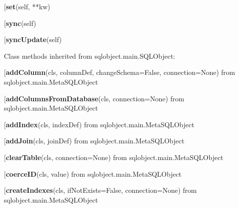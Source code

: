 \begin{description}\item[{\bf set}(self, **kw)\end{description}

\begin{description}\item[{\bf sync}(self)\end{description}

\begin{description}\item[{\bf syncUpdate}(self)\end{description}


Class methods inherited from sqlobject.main.SQLObject:\\
\begin{description}\item[{\bf addColumn}(cls, columnDef, changeSchema=False, connection=None) from sqlobject.main.MetaSQLObject\end{description}

\begin{description}\item[{\bf addColumnsFromDatabase}(cls, connection=None) from sqlobject.main.MetaSQLObject\end{description}

\begin{description}\item[{\bf addIndex}(cls, indexDef) from sqlobject.main.MetaSQLObject\end{description}

\begin{description}\item[{\bf addJoin}(cls, joinDef) from sqlobject.main.MetaSQLObject\end{description}

\begin{description}\item[{\bf clearTable}(cls, connection=None) from sqlobject.main.MetaSQLObject\end{description}

\begin{description}\item[{\bf coerceID}(cls, value) from sqlobject.main.MetaSQLObject\end{description}

\begin{description}\item[{\bf createIndexes}(cls, ifNotExists=False, connection=None) from sqlobject.main.MetaSQLObject\end{description}

